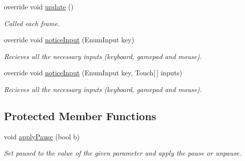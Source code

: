 \begin{DoxyCompactItemize}
\item 
override void \hyperlink{class_game_state_ae89bf9e6ab333a6def5c7f231970622a}{update} ()
\begin{DoxyCompactList}\small\item\em Called each frame.\end{DoxyCompactList}\item 
override void \hyperlink{class_game_state_a03f1715d6352805a05e94b1a59c3d95e}{notice\-Input} (Enum\-Input key)
\begin{DoxyCompactList}\small\item\em Recieves all the necessary inputs (keyboard, gamepad and mouse).\end{DoxyCompactList}\item 
override void \hyperlink{class_game_state_a55cb05db4d18ad0fbfd0baa5f9be9170}{notice\-Input} (Enum\-Input key, Touch\mbox{[}$\,$\mbox{]} inputs)
\begin{DoxyCompactList}\small\item\em Recieves all the necessary inputs (keyboard, gamepad and mouse).\end{DoxyCompactList}\end{DoxyCompactItemize}
\subsection*{Protected Member Functions}
\begin{DoxyCompactItemize}
\item 
void \hyperlink{class_game_state_aeda2b0d0f9e178d7a46f4740dadc450d}{apply\-Pause} (bool b)
\begin{DoxyCompactList}\small\item\em Set paused to the value of the given parameter and apply the pause or unpause.\end{DoxyCompactList}\end{DoxyCompactItemize}

